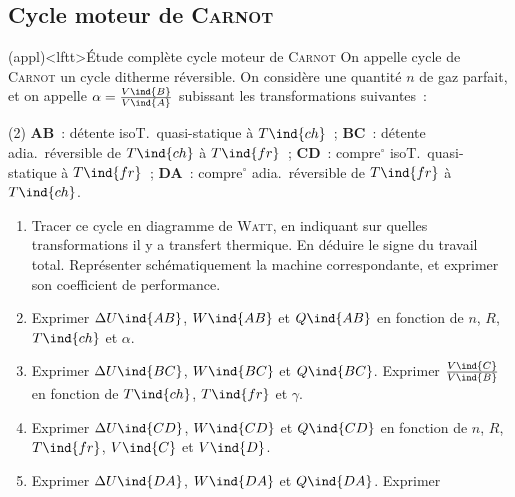 \documentclass[../../main/main.tex]{subfiles}
\begin{document}
\subsection{Cycle moteur de \textsc{Carnot}}
\begin{tcb*}[breakable](appl)<lftt>{Étude complète cycle moteur de \textsc{Carnot}}
	On appelle cycle de \textsc{Carnot} un cycle ditherme réversible. On considère
	une quantité $n$ de gaz parfait, et on appelle $\alpha =
		\frac{V\ind{B}}{V\ind{A}}$ subissant les transformations suivantes~:
	\begin{tasks}[label=\bdmd](2)
		\task \textbf{AB}~: détente isoT.\ quasi-statique à $T\ind{ch}$~;
		\task \textbf{BC}~: détente adia.\ réversible de $T\ind{ch}$ à $T\ind{fr}$~;
		\task \textbf{CD}~: compre$^\circ$ isoT.\ quasi-statique à $T\ind{fr}$~;
		\task \textbf{DA}~: compre$^\circ$ adia.\ réversible de $T\ind{fr}$ à
		$T\ind{ch}$.
	\end{tasks}
	\begin{enumerate}[label=\sqenumi]
		\item Tracer ce cycle en diagramme de \textsc{Watt}, en indiquant sur
		      quelles transformations il y a transfert thermique. En déduire le signe du
		      travail total. Représenter schématiquement la machine correspondante, et
		      exprimer son coefficient de performance.
		\item Exprimer $\Delta{U}\ind{AB}$, $W\ind{AB}$ et $Q\ind{AB}$ en fonction
		      de $n$, $R$, $T\ind{ch}$ et $\alpha$.
		\item Exprimer $\Delta{U}\ind{BC}$, $W\ind{BC}$ et $Q\ind{BC}$. Exprimer
		      $\frac{V\ind{C}}{V\ind{B}}$ en fonction de $T\ind{ch}$, $T\ind{fr}$ et
		      $\gamma$.
		\item Exprimer $\Delta{U}\ind{CD}$, $W\ind{CD}$ et $Q\ind{CD}$ en fonction
		      de $n$, $R$, $T\ind{fr}$, $V\ind{C}$ et $V\ind{D}$.
		\item Exprimer $\Delta{U}\ind{DA}$, $W\ind{DA}$ et $Q\ind{DA}$. Exprimer

\end{enumerate}
\end{tcb*}
\end{document}
